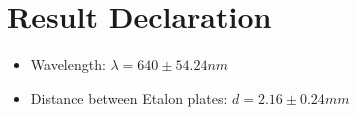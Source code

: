 \section{Result Declaration}
    \begin{itemize}
        \item Wavelength: $\lambda = 640\pm54.24nm$
        \item Distance between Etalon plates: $d = 2.16\pm0.24 mm$
    \end{itemize}